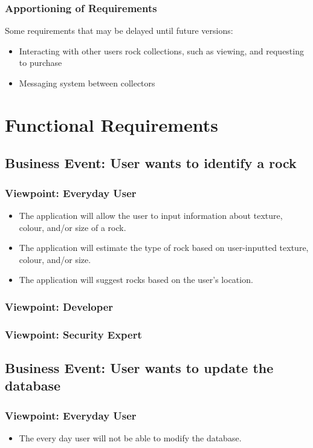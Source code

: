 \documentclass[titlepage]{article}
\begin{document}
\subsubsection{Apportioning of Requirements}

Some requirements that may be delayed until future versions:

\begin{itemize}
\item Interacting with other users rock collections, such as viewing, and requesting to purchase \\
\item Messaging system between collectors \\
\end{itemize}
\section{Functional Requirements}
\label{sec:functional_requirements}
\subsection {Business Event: User wants to identify a rock}
	\subsubsection {Viewpoint: Everyday User}
		\begin{itemize}
			\item The application will allow the user to input information about texture, colour, and/or size of a rock.
			\item The application will estimate the type of rock based on user-inputted texture, colour, and/or size.
			\item The application will suggest rocks based on the user's location.
		\end{itemize}
	\subsubsection {Viewpoint: Developer}
	\subsubsection {Viewpoint: Security Expert}
\subsection {Business Event: User wants to update the database}
	\subsubsection {Viewpoint: Everyday User}
		\begin{itemize}
			\item The every day user will not be able to modify the database.
		\end{itemize}
\end{document}
